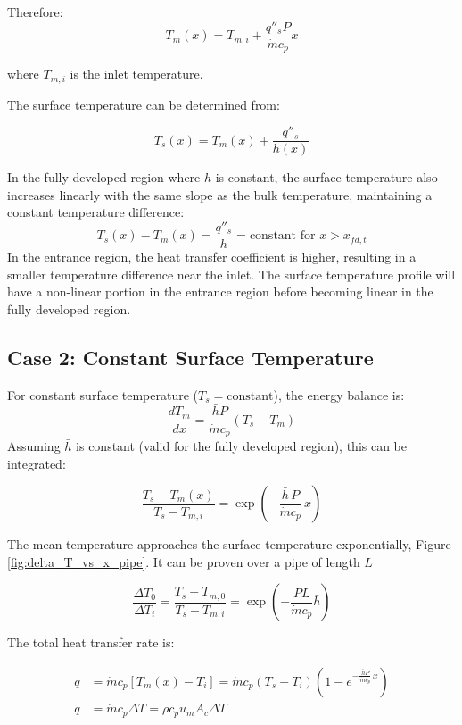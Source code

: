 Therefore:
\[
T_m(x) = T_{m,i} + \frac{q''_sP}{\dot{m}c_p}x
\]

where $T_{m,i}$ is the inlet temperature.

The surface temperature can be determined from:
\begin{definition}
  \[
    T_s(x) = T_m(x) + \frac{q''_s}{h(x)}
    \]  
\end{definition}
%
In the fully developed region where $h$ is constant, the surface temperature also increases linearly with the same slope as the bulk temperature, maintaining a constant temperature difference:
\[
T_s(x) - T_m(x) = \frac{q''_s}{h} = \text{constant for } x > x_{fd,t}
\]
%
In the entrance region, the heat transfer coefficient is higher, resulting in a smaller temperature difference near the inlet. The surface temperature profile will have a non-linear portion in the entrance region before becoming linear in the fully developed region.

\subsection*{Case 2: Constant Surface Temperature}
%
For constant surface temperature ($T_s = \text{constant}$), the energy balance is:
%
\[
    \frac{dT_m}{dx} = \frac{\bar{h}P}{\dot{m}c_p}(T_s - T_m)
\]
%
Assuming $\bar{h}$ is constant (valid for the fully developed region), this can be integrated:
\begin{definition}
 \[
    \frac{T_s - T_m(x)}{T_s - T_{m,i}} = \exp \left(-\frac{\bar{h}\,P }{\dot{m} c_p}\,x \right)
\]   
\end{definition}
%
The mean temperature approaches the surface temperature exponentially, Figure \ref{fig:delta_T_vs_x_pipe}. It can be proven over a pipe of length $L$
\begin{definition}
    \[
        \frac{\Delta T_0}{\Delta T_i}=\frac{T_s-T_{m, 0}}{T_s-T_{m, i}}=\exp \left(-\frac{P L}{\dot{m} c_p} \bar{h}\right)
\]
\end{definition}
%
The total heat transfer rate is:
\begin{definition}   
    \[
        \begin{aligned}
            q &= \dot{m}c_p[T_m(x) - T_i] = \dot{m}c_p(T_s - T_i)(1 - e^{-\frac{\bar{h}P}{\dot{m}c_p}\,x})
            \\[0.5em]
            q &= \dot{m}c_p \Delta T = \rho c_p u_m A_c\Delta T
        \end{aligned}
    \]
\end{definition}

